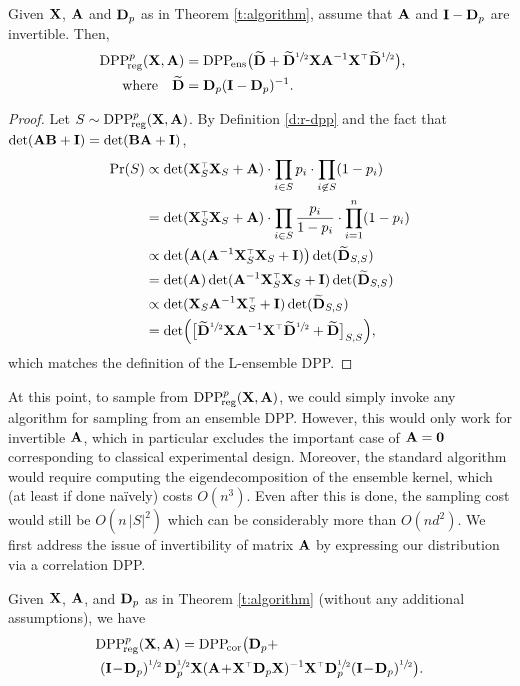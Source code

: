 \documentclass[../../thesis.tex]{subfiles}
\begin{document}
\vspace{2mm}
\begin{lemma}\label{t:reduction}
  Given $\mathbf X$, $\mathbf A$ and $\mathbf D_p$ as in Theorem \ref{t:algorithm}, assume that $\mathbf A$ and $\mathbf I-\mathbf D_p$ are
  invertible. Then,
  \begin{align*}
    \DPPreg{p}(\X,\A) & =\DPPens\big(\Dbt+
    \Dbt^{\sfrac12}\X\A^{-1}\X^\top
    \Dbt^{\sfrac12}\big),\quad                \\
    \text{where}
    \quad\Dbt         & = \D_p(\I-\D_p)^{-1}.
  \end{align*}
\end{lemma}
\begin{proof}
  Let $S\sim {{\mathrm{DPP}}_{\!\mathrm{reg}}^{p}}(\mathbf X,\mathbf A)$. By Definition \ref{d:r-dpp} and
  the fact that $\det(\mathbf A\mathbf B+\mathbf I)=\det(\mathbf B\mathbf A+\mathbf I)$,
  \begin{align*}
    \Pr(S) & \propto \det(\X_S^\top\X_S+\A)\cdot
    \prod_{i\in S}p_i\cdot\prod_{i\not\in S}(1-p_i)                                                 \\
           & = \det(\X_S^\top\X_S+\A)\cdot
    \prod_{i\in S}\frac{p_i}{1-p_i}\cdot\prod_{i=1}^n(1-p_i)
    \\ &\propto\det\!\big(\A(\A^{-1}\X_S^\top\X_S+\I)\big) \det(\Dbt_{S,S}) \\
           & =\det(\A)\det(\A^{-1}\X_S^\top\X_S+\I) \det(\Dbt_{S,S})
    \\ &\propto \det(\X_S \A^{-1}\X_S^\top+\I) \det(\Dbt_{S,S}) \\
           & =\det\!\Big(\big[\Dbt^{\sfrac12}\X \A^{-1}\X^\top\Dbt^{\sfrac12}+\Dbt\big]_{S,S}\Big),
  \end{align*}
  which matches the definition of the L-ensemble DPP.
\end{proof}
At this point, to sample from  ${{\mathrm{DPP}}_{\!\mathrm{reg}}^{p}}(\mathbf X,\mathbf A)$, we could simply
invoke any algorithm for sampling from
an ensemble DPP. However, this would only work for invertible
$\mathbf A$, which in particular excludes the important case of
$\mathbf A=\mathbf 0$ corresponding to classical experimental
design. Moreover, the standard algorithm would require computing the
eigendecomposition of the ensemble kernel, which (at
least if done na\"ively) costs $O(n^3)$. Even after this is done, the
sampling cost would still be $O(n\,|S|^2)$ which can be considerably
more than $O(nd^2)$. We first address the issue of invertibility of matrix
$\mathbf A$ by expressing our distribution via a correlation DPP.
\begin{lemma}\label{l:correlation}
  Given $\mathbf X$, $\mathbf A$, and $\mathbf D_p$ as in Theorem \ref{t:algorithm} (without
  any additional assumptions), we have
  \begin{align*}
     & \DPPreg{p}(\X,\A)
    = \DPPcor\big(\D_p +                                                                                                            \\
     & \ (\I\!-\!\D_p)^{\sfrac12}\,\D_p^{\sfrac12}\X(\A\!+\!\X^\top\D_p\X)^{-1}\X^\top\D_p^{\sfrac12}(\I\!-\!\D_p)^{\sfrac12}\big).
  \end{align*}
\end{lemma}
\end{document}

